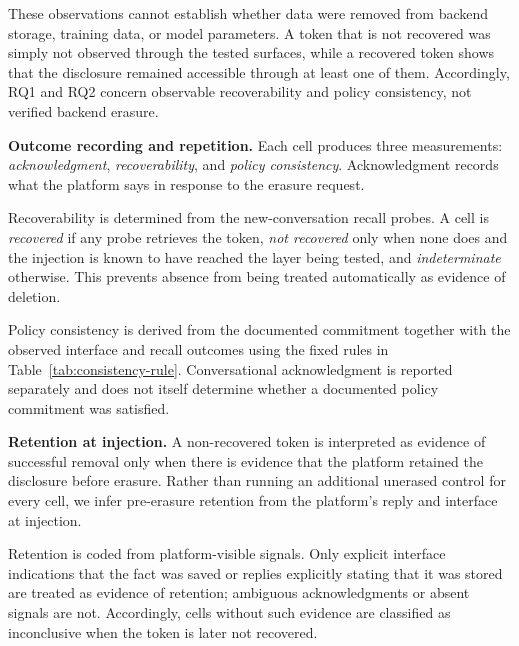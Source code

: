 \documentclass[conference,compsoc]{IEEEtran}
\begin{document}
These observations cannot establish whether data were removed from backend storage, training data, or model parameters. A token that is not recovered was simply not observed through the tested surfaces, while a recovered token shows that the disclosure remained accessible through at least one of them. Accordingly, RQ1 and RQ2 concern observable recoverability and policy consistency, not verified backend erasure.

\textbf{Outcome recording and repetition.} Each cell produces three measurements: \textit{acknowledgment}, \textit{recoverability}, and \textit{policy consistency}. Acknowledgment records what the platform says in response to the erasure request.

Recoverability is determined from the new-conversation recall probes. A cell is \textit{recovered} if any probe retrieves the token, \textit{not recovered} only when none does and the injection is known to have reached the layer being tested, and \textit{indeterminate} otherwise. This prevents absence from being treated automatically as evidence of deletion.

Policy consistency is derived from the documented commitment together with the observed interface and recall outcomes using the fixed rules in Table~\ref{tab:consistency-rule}. Conversational acknowledgment is reported separately and does not itself determine whether a documented policy commitment was satisfied.

\textbf{Retention at injection.} A non-recovered token is interpreted as evidence of successful removal only when there is evidence that the platform retained the disclosure before erasure. Rather than running an additional unerased control for every cell, we infer pre-erasure retention from the platform's reply and interface at injection.

Retention is coded from platform-visible signals. Only explicit interface indications that the fact was saved or replies explicitly stating that it was stored are treated as evidence of retention; ambiguous acknowledgments or absent signals are not. Accordingly, cells without such evidence are classified as inconclusive when the token is later not recovered.
\end{document}

